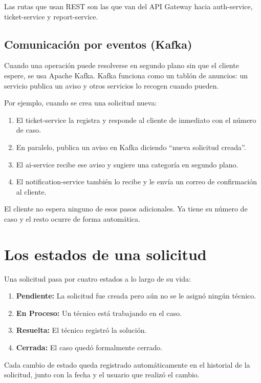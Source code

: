 \documentclass[12pt, a4paper]{report}
\begin{document}
Las rutas que usan REST son las que van del API Gateway hacia
auth-service, ticket-service y report-service.

\subsection{Comunicación por eventos (Kafka)}

Cuando una operación puede resolverse en segundo plano sin que el
cliente espere, se usa Apache Kafka. Kafka funciona como un tablón
de anuncios: un servicio publica un aviso y otros servicios lo
recogen cuando pueden.

Por ejemplo, cuando se crea una solicitud nueva:

\begin{enumerate}
  \item El ticket-service la registra y responde al cliente de
        inmediato con el número de caso.
  \item En paralelo, publica un aviso en Kafka diciendo
        ``nueva solicitud creada''.
  \item El ai-service recibe ese aviso y sugiere una categoría
        en segundo plano.
  \item El notification-service también lo recibe y le envía
        un correo de confirmación al cliente.
\end{enumerate}

El cliente no espera ninguno de esos pasos adicionales. Ya tiene
su número de caso y el resto ocurre de forma automática.

\newpage
\section{Los estados de una solicitud}

Una solicitud pasa por cuatro estados a lo largo de su vida:

\begin{enumerate}
  \item \textbf{Pendiente:} La solicitud fue creada pero aún no
        se le asignó ningún técnico.
  \item \textbf{En Proceso:} Un técnico está trabajando en el caso.
  \item \textbf{Resuelta:} El técnico registró la solución.
  \item \textbf{Cerrada:} El caso quedó formalmente cerrado.
\end{enumerate}

Cada cambio de estado queda registrado automáticamente en el
historial de la solicitud, junto con la fecha y el usuario que
realizó el cambio.
\end{document}
